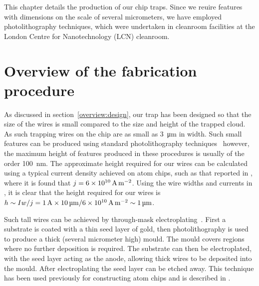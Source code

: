 This chapter details the production of our chip traps. Since we reuire features
with dimensions on the scale of several micrometers, we have employed
photolithography techniques, which were undertaken in cleanroom facilities at
the London Centre for Nanotechnology (LCN) cleanroom. 

\section{Overview of the fabrication procedure}

As discussed in section~\ref{overview:design}, our trap has been designed so
that the size of the wires is small compared to the size and height of the
trapped cloud. As such trapping wires on the chip are as small as
\SI{3}{\micro\meter} in width. Such small features can be produced using
standard photolithography techniques~\cite{Madou2002} however, the maximum
height of features produced in these procedures is usually of the order
\SI{100}{\nano\meter}.
%
The approximate height required for our wires can be calculated using a
typical current density achieved on atom chips, such as that reported in
, where it is found that
$j=\SI{6E10}{\ampere\per\meter\squared}$. Using the wire widths and currents in
, it is clear that the height required for our
wires is $h \sim I w/j = \SI{1}{\ampere} \times
\SI{10}{\micro\meter}/\SI{6E10}{\ampere\per\meter\squared} \sim
\SI{1}{\micro\meter}$.

Such tall wires can be achieved by through-mask electroplating~\cite{Ruythooren_2000}.
First a substrate is coated with a thin seed layer of gold, then
photolithography is used to produce a thick (several micrometer high) mould.
The mould covers regions where no further deposition is required. The substrate
can then be electroplated, with the seed layer acting as the anode, allowing
thick wires to be deposited into the mould.  After electroplating the seed
layer can be etched away. This technique has been used previously for
constructing atom chips and is described in .

